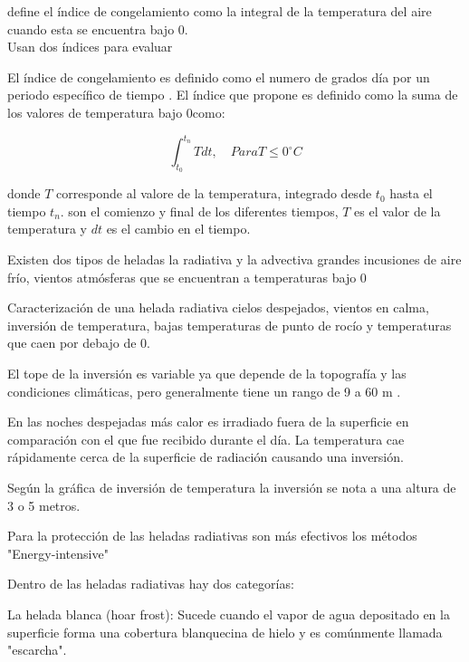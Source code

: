 \citet{prabha2008evaluation} define el índice de congelamiento como la integral de la temperatura del aire cuando esta se encuentra bajo 0\celc.\\

\citet{prabha2008evaluation} Usan dos índices para evaluar

El índice de congelamiento es definido como el numero de grados día por un periodo específico de tiempo \citep{frauenfeld2007northern}. El índice que propone \citet{frauenfeld2007northern} es definido como la suma de los valores de temperatura bajo 0\celc como:

\begin{equation}\label{eq:frost_index}
    \int_{t_0}^{t_n} T dt,\quad Para T \leq 0^{\circ}C
\end{equation}

donde $T$ corresponde al valore de la temperatura, integrado desde $t_0$ hasta el tiempo $t_n$. son el comienzo y final de los diferentes tiempos, $T$ es el valor de la temperatura y $dt$ es el cambio en el tiempo.

Existen dos tipos de heladas la radiativa y la advectiva \citep{snyder2005frost} grandes incusiones de aire frío, vientos atmósferas que se encuentran a temperaturas bajo 0\celc 

Caracterización de una helada radiativa cielos despejados, vientos en calma, inversión de temperatura, bajas temperaturas de punto de rocío y temperaturas que caen por debajo de 0\celc.

El tope de la inversión es variable ya que depende de la topografía y las condiciones climáticas, pero generalmente tiene un rango de 9 a 60 m \citep{snyder2005frost}.

En las noches despejadas más calor es irradiado fuera de la superficie en comparación con el que fue recibido durante el día. La temperatura cae rápidamente cerca de la superficie de radiación causando una inversión.

Según la gráfica de inversión de temperatura la inversión se nota a una altura de 3 o 5 metros. 

Para la protección de las heladas radiativas son más efectivos los métodos "Energy-intensive"

Dentro de las heladas radiativas hay dos categorías:

La helada blanca (hoar frost): Sucede cuando el vapor de agua depositado en la superficie forma una cobertura blanquecina de hielo y es comúnmente llamada "escarcha".


